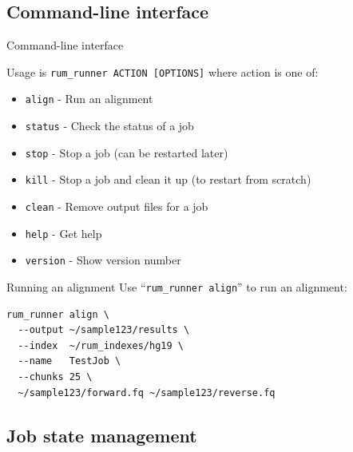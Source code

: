 \documentclass{beamer}
\begin{document}
\subsection{Command-line interface}

\begin{frame}{Command-line interface}

  Usage is \texttt{rum\_runner ACTION [OPTIONS]} where action is one of:

  \begin{itemize}
  \item \texttt{align} - Run an alignment
  \item \texttt{status} - Check the status of a job
  \item \texttt{stop} - Stop a job (can be restarted later)
  \item \texttt{kill} - Stop a job and clean it up (to restart from scratch)
  \item \texttt{clean} - Remove output files for a job
  \item \texttt{help} - Get help
  \item \texttt{version} - Show version number
  \end{itemize}

\end{frame}

\begin{frame}[fragile]{Running an alignment}
Use ``\texttt{rum\_runner align}'' to run an alignment:
\begin{verbatim}
rum_runner align \
  --output ~/sample123/results \
  --index  ~/rum_indexes/hg19 \
  --name   TestJob \
  --chunks 25 \
  ~/sample123/forward.fq ~/sample123/reverse.fq
\end{verbatim}
\end{frame}

\subsection{Job state management}
\end{document}
